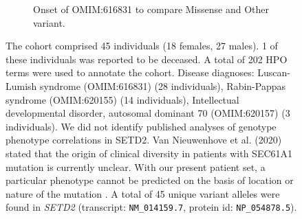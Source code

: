 \begin{figure}[htbp]
\begin{subfigure}[b]{0.95\textwidth}
\captionsetup{justification=raggedright,singlelinecheck=false}
\caption{Onset of OMIM:616831 to compare Missense and Other variant. }
\end{subfigure}

\caption{The cohort comprised 45 individuals (18 females, 27 males). 1 of these individuals was reported to be deceased. 
A total of 202 HPO terms were used to annotate the cohort. 
Disease diagnoses: Luscan-Lumish syndrome (OMIM:616831) (28 individuals), 
Rabin-Pappas syndrome (OMIM:620155) (14 individuals), 
Intellectual developmental disorder, autosomal dominant 70 (OMIM:620157) (3 individuals). 
We did not identify published analyses of genotype phenotype correlations in SETD2. Van Nieuwenhove et al. (2020) stated that 
the origin of clinical diversity in patients with SEC61A1 mutation is currently unclear. 
With our present patient set, a particular phenotype cannot be predicted on the basis of location or nature of the mutation \cite{PMID_32325141}. 
A total of 45 unique variant alleles were found in \textit{SETD2} (transcript: \texttt{NM\_014159.7}, protein id: \texttt{NP\_054878.5}).}
\end{figure}
